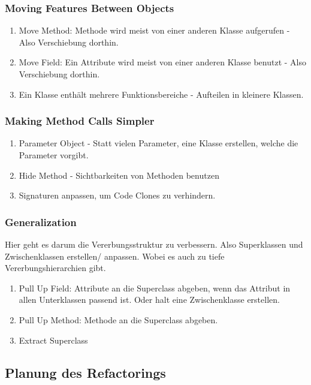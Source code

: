 \documentclass[a4paper]{article}
\begin{document}
\subsubsection{Moving Features Between Objects}

\begin{enumerate}
    \item Move Method: Methode wird meist von einer anderen Klasse aufgerufen - Also Verschiebung dorthin.
    \item Move Field: Ein Attribute wird meist von einer anderen Klasse benutzt - Also Verschiebung dorthin.
    \item Ein Klasse enthält mehrere Funktionsbereiche - Aufteilen in kleinere Klassen.
\end{enumerate}

\subsubsection{Making Method Calls Simpler}

\begin{enumerate}
    \item Parameter Object - Statt vielen Parameter, eine Klasse erstellen, welche die Parameter vorgibt.
    \item Hide Method - Sichtbarkeiten von Methoden benutzen
    \item Signaturen anpassen, um Code Clones zu verhindern.
\end{enumerate}

\subsubsection{Generalization}

Hier geht es darum die Vererbungsstruktur zu verbessern. Also Superklassen und Zwischenklassen erstellen/ anpassen. Wobei es auch zu tiefe Vererbungshierarchien gibt.

\begin{enumerate}
    \item Pull Up Field: Attribute an die Superclass abgeben, wenn das Attribut in allen Unterklassen passend ist. Oder halt eine Zwischenklasse erstellen.
    \item Pull Up Method: Methode an die Superclass abgeben.
    \item Extract Superclass
\end{enumerate}

\subsection{Planung des Refactorings}
\end{document}
